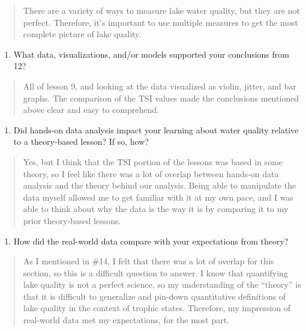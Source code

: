 \documentclass[]{article}
\providecommand{\tightlist}{%
  \setlength{\itemsep}{0pt}\setlength{\parskip}{0pt}}
\begin{document}
\begin{quote}
There are a variety of ways to measure lake water quality, but they are
not perfect. Therefore, it's important to use multiple measures to get
the most complete picture of lake quality.
\end{quote}

\begin{enumerate}
\def\labelenumi{\arabic{enumi}.}
\setcounter{enumi}{12}
\tightlist
\item
  What data, visualizations, and/or models supported your conclusions
  from 12?
\end{enumerate}

\begin{quote}
All of lesson 9, and looking at the data visualized as violin, jitter,
and bar graphs. The comparison of the TSI values made the conclusions
mentioned above clear and easy to comprehend.
\end{quote}

\begin{enumerate}
\def\labelenumi{\arabic{enumi}.}
\setcounter{enumi}{13}
\tightlist
\item
  Did hands-on data analysis impact your learning about water quality
  relative to a theory-based lesson? If so, how?
\end{enumerate}

\begin{quote}
Yes, but I think that the TSI portion of the lessons was based in some
theory, so I feel like there was a lot of overlap between hands-on data
analysis and the theory behind our analysis. Being able to manipulate
the data myself allowed me to get familiar with it at my own pace, and I
was able to think about why the data is the way it is by comparing it to
my prior theory-based lessons.
\end{quote}

\begin{enumerate}
\def\labelenumi{\arabic{enumi}.}
\setcounter{enumi}{14}
\tightlist
\item
  How did the real-world data compare with your expectations from
  theory?
\end{enumerate}

\begin{quote}
As I mentioned in \#14, I felt that there was a lot of overlap for this
section, so this is a difficult question to answer. I know that
quantifying lake quality is not a perfect science, so my understanding
of the ``theory'' is that it is difficult to generalize and pin-down
quantitative definitions of lake quality in the context of trophic
states. Therefore, my impression of real-world data met my expectations,
for the most part.
\end{quote}
\end{document}
